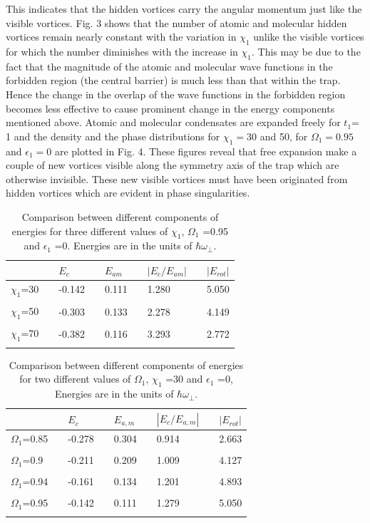 \documentclass[10pt,a4paper]{article}
\begin{document}
This indicates that the hidden vortices carry the angular momentum just like the visible vortices. 
Fig. 3 shows that the number of atomic and molecular hidden vortices remain nearly constant with 
the variation in $\chi_1$ unlike the visible vortices for which
the number diminishes with the increase in $\chi_1$. This may be
due to the fact that the magnitude of the atomic and molecular
wave functions in the forbidden region (the central barrier) is
much less than that within the trap. Hence the change in the
overlap of the wave functions in the forbidden region becomes less
effective to cause prominent change in the energy components
mentioned above. Atomic and molecular condensates are expanded
freely for  $t_1$= 1 and the density and the phase distributions
for $\chi_1= 30$ and 50, for $\Omega_1= 0.95$ and $\epsilon_1= 0$ are plotted
in Fig. 4. These figures reveal that free expansion make a couple
of new vortices visible along the symmetry axis of the trap which
are otherwise invisible. These new visible vortices must have been
originated from hidden vortices which are evident in phase
singularities.


\begin{table}
\caption {Comparison between different components of energies for
three different values of $\chi_1$, $\Omega_1$ =0.95 and
$\epsilon_1$ =0. Energies are in the units of
$\hbar\omega_\perp$.}
\begin{tabular}{lllllllll}
\hline\hline
&& $E_c$ && $E_{am}$ && $|E_c/ E_{am}|$ && $|E_{rot}|$\\
\hline
 $\chi_1$=30 && -0.142 && 0.111 && 1.280 && 5.050\\\\
\hline
 $\chi_1$=50 && -0.303 && 0.133 && 2.278 && 4.149\\\\
\hline
 $\chi_1$=70 && -0.382 && 0.116 && 3.293 && 2.772\\\\
 \hline\hline
\end{tabular}
\end{table}

\begin{table}
\caption {Comparison between different components of energies for
two different values of $\Omega_1$, $\chi_1$ =30 and $\epsilon_1$
=0, Energies are in the units of $\hbar\omega_\perp$.}
\begin{tabular}{lllllllll}
\hline\hline
&& $E_c$ && $E_{a,m}$ && $|E_c/ E_{a,m}|$ && $|E_{rot}|$\\
\hline
$\Omega_1$=0.85 && -0.278 && 0.304 && 0.914 && 2.663\\\\
\hline
 $\Omega_1$=0.9 && -0.211 && 0.209 && 1.009 && 4.127\\\\
\hline
 $\Omega_1$=0.94 && -0.161 && 0.134 && 1.201 && 4.893\\\\
\hline
 $\Omega_1$=0.95 && -0.142 && 0.111 && 1.279 && 5.050\\\\
 \hline\hline
\end{tabular}
\end{table}
\end{document}
